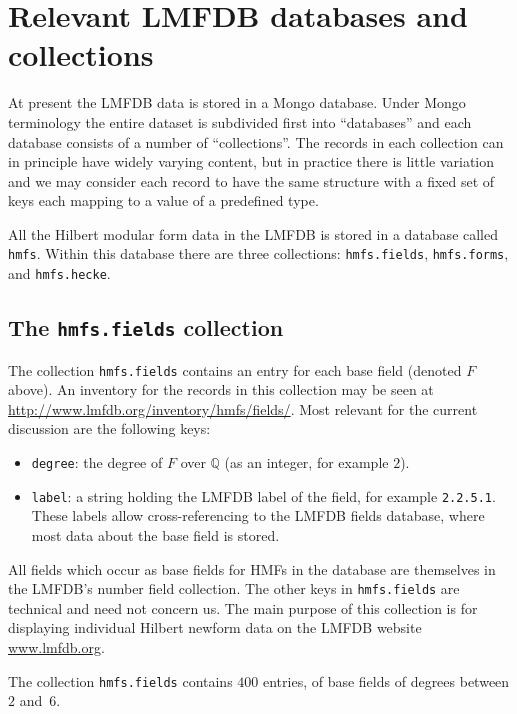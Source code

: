 \documentclass{llncs}
\def\Q{{\mathbb Q}}
\begin{document}
\section{Relevant LMFDB databases and collections}
At present the LMFDB data is stored in a Mongo database.  Under Mongo
terminology the entire dataset is subdivided first into ``databases''
and each database consists of a number of ``collections''.  The
records in each collection can in principle have widely varying
content, but in practice there is little variation and we may consider
each record to have the same structure with a fixed set of keys each
mapping to a value of a predefined type.

All the Hilbert modular form data in the LMFDB is stored in a database
called {\tt hmfs}.  Within this database there are three collections:
{\tt hmfs.fields}, {\tt hmfs.forms}, and {\tt hmfs.hecke}.

\subsection{The {\tt hmfs.fields} collection}
The collection {\tt hmfs.fields} contains an entry for each base field
(denoted $F$ above).  An inventory for the records in this collection
may be seen at \url{http://www.lmfdb.org/inventory/hmfs/fields/}.
Most relevant for the current discussion are the following keys:
\begin{itemize}
\item {\tt degree}: the degree of $F$ over $\Q$ (as an integer,
  for example $2$).
\item {\tt label}: a string holding the LMFDB label
  of the field, for example {\tt 2.2.5.1}.  These labels allow
  cross-referencing to the LMFDB fields database, where most data
  about the base field is stored.
\end{itemize}
All fields which occur as base fields for HMFs in the database are
themselves in the LMFDB's number field collection.  The other keys in
{\tt hmfs.fields} are technical and need not concern us.  The main
purpose of this collection is for displaying individual Hilbert
newform data on the LMFDB website \url{www.lmfdb.org}.

The collection {\tt hmfs.fields} contains $400$ entries, of base
fields of degrees between $2$ and~$6$.
\end{document}
